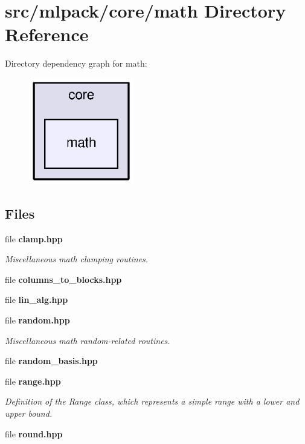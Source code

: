 \section{src/mlpack/core/math Directory Reference}
\label{dir_c99ddc62a84c9c2eac1febe115accba9}
Directory dependency graph for math\+:
\nopagebreak
\begin{figure}[H]
\begin{center}
\leavevmode
\includegraphics[width=130pt]{dir_c99ddc62a84c9c2eac1febe115accba9_dep}
\end{center}
\end{figure}
\subsection*{Files}
\begin{DoxyCompactItemize}
\item 
file {\bf clamp.\+hpp}
\begin{DoxyCompactList}\small\item\em Miscellaneous math clamping routines. \end{DoxyCompactList}\item 
file {\bf columns\+\_\+to\+\_\+blocks.\+hpp}
\item 
file {\bf lin\+\_\+alg.\+hpp}
\item 
file {\bf random.\+hpp}
\begin{DoxyCompactList}\small\item\em Miscellaneous math random-\/related routines. \end{DoxyCompactList}\item 
file {\bf random\+\_\+basis.\+hpp}
\item 
file {\bf range.\+hpp}
\begin{DoxyCompactList}\small\item\em Definition of the Range class, which represents a simple range with a lower and upper bound. \end{DoxyCompactList}\item 
file {\bf round.\+hpp}
\end{DoxyCompactItemize}
